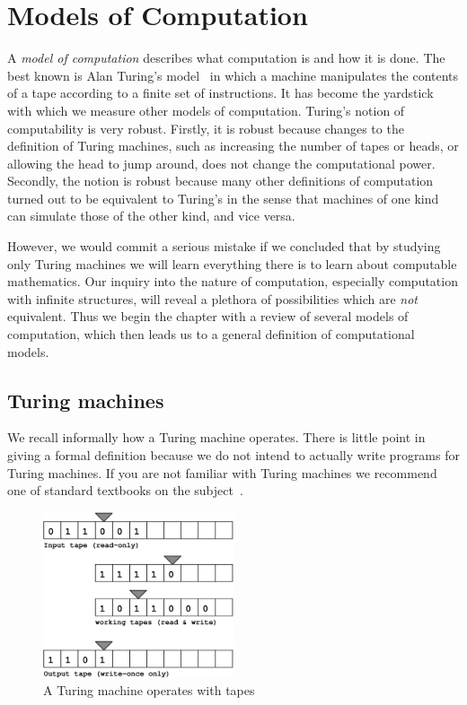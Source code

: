 \chapter{Models of Computation}
\label{cha:models}


A \emph{model of computation} describes what computation is and how it
is done. The best known is Alan Turing's
model~ in which a
machine manipulates the contents of a tape according to a finite set
of instructions. It has become the yardstick with which we measure
other models of computation. Turing's notion of computability is very
robust. Firstly, it is robust because changes to the definition of
Turing machines, such as increasing the number of tapes or heads, or
allowing the head to jump around, does not change the computational
power. Secondly, the notion is robust because many other definitions
of computation turned out to be equivalent to Turing's in the sense
that machines of one kind can simulate those of the other kind, and
vice versa.

However, we would commit a serious mistake if we concluded that by
studying only Turing machines we will learn everything there is to
learn about computable mathematics. Our inquiry into the nature of
computation, especially computation with infinite structures, will
reveal a plethora of possibilities which are \emph{not} equivalent.
Thus we begin the chapter with a review of several models of
computation, which then leads us to a general definition of
computational models.


\section{Turing machines}
\label{sec:turing-machines}

We recall informally how a Turing machine operates. There is little
point in giving a formal definition because we do not intend to
actually write programs for Turing machines. If you are not familiar
with Turing machines we recommend one of standard textbooks on the
subject~.

\begin{figure}[htbp]
  \centering
  \includegraphics[width=0.5\textwidth]{turing_machine}
  \caption{A Turing machine operates with tapes}
  \label{fig:turing-machine}
\end{figure}


